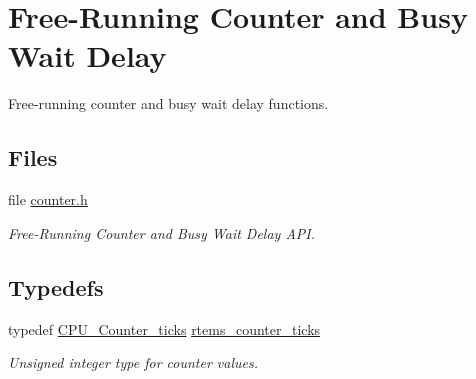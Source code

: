 \hypertarget{group__ClassicCounter}{}\section{Free-\/\+Running Counter and Busy Wait Delay}
\label{group__ClassicCounter}


Free-\/running counter and busy wait delay functions.  


\subsection*{Files}
\begin{DoxyCompactItemize}
\item 
file \mbox{\hyperlink{counter_8h}{counter.\+h}}
\begin{DoxyCompactList}\small\item\em Free-\/\+Running Counter and Busy Wait Delay A\+PI. \end{DoxyCompactList}\end{DoxyCompactItemize}
\subsection*{Typedefs}
\begin{DoxyCompactItemize}
\item 
\mbox{\label{group__ClassicCounter_gafda796220404920ac0af841d9f555262}} 
typedef \mbox{\hyperlink{no__cpu_2include_2rtems_2score_2cpu_8h_a67f8550aad58bccb6fcb4589894444ad}{C\+P\+U\+\_\+\+Counter\+\_\+ticks}} \mbox{\hyperlink{group__ClassicCounter_gafda796220404920ac0af841d9f555262}{rtems\+\_\+counter\+\_\+ticks}}
\begin{DoxyCompactList}\small\item\em Unsigned integer type for counter values. \end{DoxyCompactList}\end{DoxyCompactItemize}
